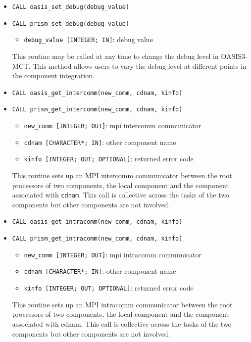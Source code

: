 \begin{itemize}
  \vspace{0.2cm}
\item {\tt CALL oasis\_set\_debug(debug\_value)}
\item {\tt CALL prism\_set\_debug(debug\_value)}
  \begin{itemize}
  \item {\tt debug\_value [INTEGER; IN]}: debug value
  \end{itemize}

  This routine may be called at any time to change the debug level in
  OASIS3-MCT.  This method allows users to vary the debug level at
  different points in the component integration.

  \vspace{0.2cm}
\item {\tt CALL oasis\_get\_intercomm(new\_comm, cdnam, kinfo)}
\item {\tt CALL prism\_get\_intercomm(new\_comm, cdnam, kinfo)}
  \begin{itemize}
  \item {\tt new\_comm [INTEGER; OUT]}: mpi intercomm communicator
  \item {\tt cdnam [CHARACTER*; IN]}: other component name
  \item {\tt kinfo [INTEGER; OUT; OPTIONAL]}: returned error code
  \end{itemize}

  This routine sets up an MPI intercomm communicator between the root
  processors of two components, the local component and the component
  associated with {\tt cdnam}.  This call is collective across the
  tasks of the two components but other components are not involved.

  \vspace{0.2cm}
\item {\tt CALL oasis\_get\_intracomm(new\_comm, cdnam, kinfo)}
\item {\tt CALL prism\_get\_intracomm(new\_comm, cdnam, kinfo)}
  \begin{itemize}
  \item {\tt new\_comm [INTEGER; OUT]}: mpi intracomm communicator
  \item {\tt cdnam [CHARACTER*; IN]}: other component name
  \item {\tt kinfo [INTEGER; OUT; OPTIONAL]}: returned error code
  \end{itemize}

  This routine sets up an MPI intracomm communicator between the root
  processors of two components, the local component and the component
  associated with cdnam.  This call is collective across the tasks of
  the two components but other components are not involved.


\end{itemize}
